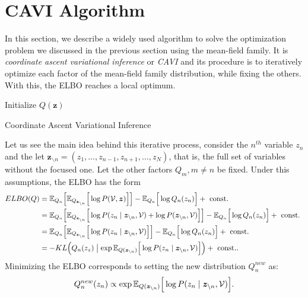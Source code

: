 \section{CAVI Algorithm }

In this section, we describe a widely used algorithm to solve the optimization problem we discussed in the previous section using the mean-field family. It is \emph{coordinate ascent variational inference} or \emph{CAVI} and its procedure is to iteratively optimize each factor of the mean-field family distribution, while fixing the others. With this, the ELBO reaches a local optimum.

 \begin{algorithm}[t]
  \SetAlgoLined
  Initialize \(Q(\bm{z})\)\;
  \;
  \caption{Coordinate Ascent Variational Inference}
  \label{alg:cavi}
\end{algorithm}

Let us see the main idea behind this iterative process, consider the \(n^{th}\) variable \(z_{n}\) and the let \(\bm{z}_{\backslash n} = (z_{1},\dots,z_{n-1},z_{n+1},\dots,z_{N})\), that is, the full set of variables without the focused one. Let the other factors \(Q_{m}, m\neq n\) be fixed. Under this assumptions, the ELBO has the form
\[
  \begin{aligned}
    ELBO(Q) &= \mathbb{E}_{Q_{n}}\Big[\mathbb{E}_{Q_{\bm{z}_{\backslash n}}}\Big[\log{P(\mathcal{V}, \bm{z})}\Big]\Big] - \mathbb{E}_{Q_{n}}\Big[\log{Q_{n}(z_{n})}\Big] + \text{ const. }\\
    &= \mathbb{E}_{Q_{n}}\Big[\mathbb{E}_{Q_{\bm{z}_{\backslash n}}}\Big[\log{P(z_{n} \mid \bm{z}_{\backslash n}, \mathcal{V})} + \log{P(\bm{z}_{\backslash n}, \mathcal{V})}\Big]\Big] - \mathbb{E}_{Q_{n}}\Big[\log{Q_{n}(z_{n})}\Big] + \text{ const. }\\
    &=  \mathbb{E}_{Q_{n}}\Big[\mathbb{E}_{Q_{\bm{z}_{\backslash n}}}\Big[\log{P(z_{n} \mid \bm{z}_{\backslash n}, \mathcal{V})}\Big]\Big] - \mathbb{E}_{Q_{n}}\Big[\log{Q_{n}(z_{n})}\Big] + \text{ const. }\\
    &= - KL\Big(Q_{n}(z_{z}) \bigm|   \exp{\mathbb{E}_{Q(\bm{z}_{\backslash n})}\Big[\log{P(z_{n} \mid \bm{z}_{\backslash n}, \mathcal{V})}\Big]} \Big) + \text{ const.}.
  \end{aligned}
\]
Minimizing the ELBO corresponds to setting the new distribution \(Q_{n}^{new}\) as:
\[
  Q_{n}^{new}(z_{n}) \propto \exp{\mathbb{E}_{Q(\bm{z}_{\backslash n})}\Big[\log{P(z_{n} \mid \bm{z}_{\backslash n}, \mathcal{V})}\Big]}.
\]

